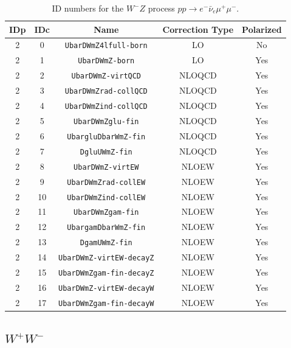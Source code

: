 \documentclass[english,12pt]{article}
\begin{document}
\begin{table}[th!]
\begin{center}
\begin{tabular}{|c|c|c|c|c|}\hline
IDp & IDc & Name & Correction Type & Polarized \\
\hline
2 & 0 & {\tt UbarDWmZ4lfull-born} & LO & No\\
2 & 1 & {\tt UbarDWmZ-born} & LO & Yes\\
2 & 2 & {\tt UbarDWmZ-virtQCD} & NLOQCD & Yes\\
2 & 3 & {\tt UbarDWmZrad-collQCD} & NLOQCD & Yes\\
2 & 4 & {\tt UbarDWmZind-collQCD} & NLOQCD & Yes\\
2 & 5 & {\tt UbarDWmZglu-fin} & NLOQCD & Yes\\
2 & 6 & {\tt UbargluDbarWmZ-fin} & NLOQCD & Yes\\
2 & 7 & {\tt DgluUWmZ-fin} & NLOQCD & Yes\\
2 & 8 & {\tt UbarDWmZ-virtEW} & NLOEW & Yes\\
2 & 9 & {\tt UbarDWmZrad-collEW} & NLOEW & Yes\\
2 & 10 & {\tt UbarDWmZind-collEW} & NLOEW & Yes\\
2 & 11 & {\tt UbarDWmZgam-fin} & NLOEW & Yes\\
2 & 12 & {\tt UbargamDbarWmZ-fin} & NLOEW & Yes\\
2 & 13 & {\tt DgamUWmZ-fin} & NLOEW & Yes\\
2 & 14 & {\tt UbarDWmZ-virtEW-decayZ} & NLOEW & Yes\\
2 & 15 & {\tt UbarDWmZgam-fin-decayZ} & NLOEW & Yes\\
2 & 16 & {\tt UbarDWmZ-virtEW-decayW} & NLOEW & Yes\\
2 & 17 & {\tt UbarDWmZgam-fin-decayW} & NLOEW & Yes\\
\hline
\end{tabular}
\caption{\small ID numbers for the $W^-Z$ process $pp \to e^-\bar{\nu}_e\mu^+\mu^-$.}
\label{tab:IDs_proc_cont_WmZ}
\end{center}
\end{table}

\newpage
\subsection{$W^+ W^-$}

\end{document}
